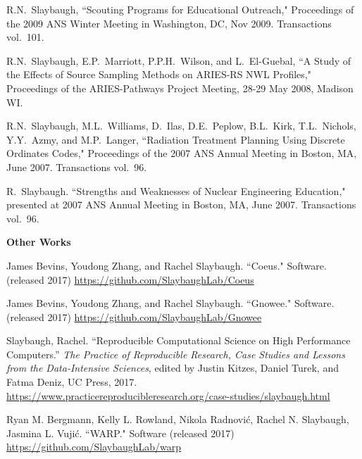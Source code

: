 \begin{bibsection}
\item R.N.\ Slaybaugh, ``Scouting Programs for Educational Outreach," Proceedings of the 2009 ANS Winter Meeting in Washington, DC, Nov 2009. Transactions vol.\ 101.

\item R.N.\ Slaybaugh, E.P.\ Marriott, P.P.H.\ Wilson, and L.\ El-Guebal, ``A Study of the Effects of Source Sampling Methods on ARIES-RS NWL Profiles," Proceedings of the ARIES-Pathways Project Meeting, 28-29 May 2008, Madison WI. 

\item R.N.\ Slaybaugh, M.L.\ Williams, D.\ Ilas, D.E.\ Peplow, B.L.\ Kirk, T.L.\ Nichols, Y.Y.\ Azmy, and M.P.\ Langer, ``Radiation Treatment Planning Using Discrete Ordinates Codes," Proceedings of the 2007 ANS Annual Meeting in Boston, MA, June 2007. Transactions vol.\ 96.

\item R.\ Slaybaugh. ``Strengths and Weaknesses of Nuclear Engineering Education," presented at 2007 ANS Annual Meeting in Boston, MA, June 2007. Transactions vol.\ 96.


\item \textbf{Other Works}
\item James Bevins, Youdong Zhang, and Rachel Slaybaugh. ``Coeus." Software. (released 2017) \url{https://github.com/SlaybaughLab/Coeus} 

\item James Bevins, Youdong Zhang, and Rachel Slaybaugh. ``Gnowee." Software. (released 2017) \url{https://github.com/SlaybaughLab/Gnowee} 

\item Slaybaugh, Rachel. ``Reproducible Computational Science on High Performance Computers.'' \textit{The Practice of Reproducible Research, Case Studies and Lessons from the Data-Intensive Sciences}, edited by Justin Kitzes, Daniel Turek, and Fatma Deniz, UC Press, 2017. \\ \url{https://www.practicereproducibleresearch.org/case-studies/slaybaugh.html}

\item Ryan M. Bergmann, Kelly L. Rowland, Nikola Radnovi\'c, Rachel N. Slaybaugh, Jasmina L. Vuji\'c. ``WARP." Software (released 2017) \url{https://github.com/SlaybaughLab/warp}

\end{bibsection}

